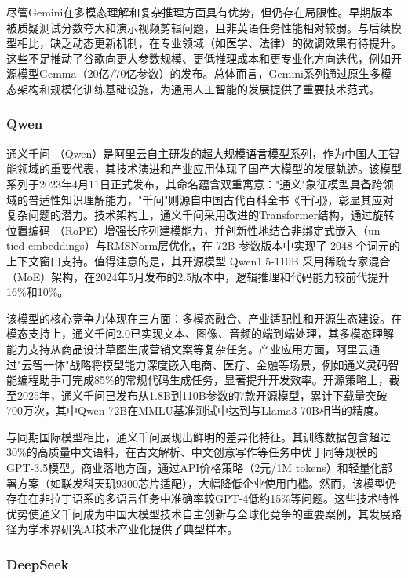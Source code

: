 尽管Gemini在多模态理解和复杂推理方面具有优势，但仍存在局限性。早期版本被质疑测试分数夸大和演示视频剪辑问题，且非英语任务性能相对较弱。与后续模型相比，缺乏动态更新机制，在专业领域（如医学、法律）的微调效果有待提升。这些不足推动了谷歌向更大参数规模、更低推理成本和更专业化方向迭代，例如开源模型Gemma（20亿/70亿参数）的发布。总体而言，Gemini系列通过原生多模态架构和规模化训练基础设施，为通用人工智能的发展提供了重要技术范式。

\subsubsection{Qwen}
\label{sec:TOSWT-gen-qwen}

通义千问 \cite{qwen2025qwen25technicalreport} （Qwen）是阿里云自主研发的超大规模语言模型系列，作为中国人工智能领域的重要代表，其技术演进和产业应用体现了国产大模型的发展轨迹。该模型系列于2023年4月11日正式发布，其命名蕴含双重寓意："通义"象征模型具备跨领域的普适性知识理解能力，"千问"则源自中国古代百科全书《千问》，彰显其应对复杂问题的潜力。技术架构上，通义千问采用改进的Transformer结构，通过旋转位置编码 \cite{su2023roformerenhancedtransformerrotary}（RoPE）增强长序列建模能力，并创新性地结合非绑定式嵌入（un-tied embeddings）与RMSNorm层优化，在 72B 参数版本中实现了 2048 个词元的上下文窗口支持。值得注意的是，其开源模型 Qwen1.5-110B 采用稀疏专家混合（MoE）架构，在2024年5月发布的2.5版本中，逻辑推理和代码能力较前代提升16\%和10\%。

该模型的核心竞争力体现在三方面：多模态融合、产业适配性和开源生态建设。在模态支持上，通义千问2.0已实现文本、图像、音频的端到端处理，其多模态理解能力支持从商品设计草图生成营销文案等复杂任务。产业应用方面，阿里云通过"云智一体"战略将模型能力深度嵌入电商、医疗、金融等场景，例如通义灵码智能编程助手可完成85\%的常规代码生成任务，显著提升开发效率。开源策略上，截至2025年，通义千问已发布从1.8B到110B参数的7款开源模型，累计下载量突破700万次，其中Qwen-72B在MMLU基准测试中达到与Llama3-70B相当的精度。

与同期国际模型相比，通义千问展现出鲜明的差异化特征。其训练数据包含超过30\%的高质量中文语料，在古文解析、中文创意写作等任务中优于同等规模的GPT-3.5模型。商业落地方面，通过API价格策略（2元/1M tokens）和轻量化部署方案（如联发科天玑9300芯片适配），大幅降低企业使用门槛。然而，该模型仍存在在非拉丁语系的多语言任务中准确率较GPT-4低约15\%等问题。这些技术特性优势使通义千问成为中国大模型技术自主创新与全球化竞争的重要案例，其发展路径为学术界研究AI技术产业化提供了典型样本。

\subsubsection{DeepSeek}
\label{sec:TOSWT-gen-ds}

